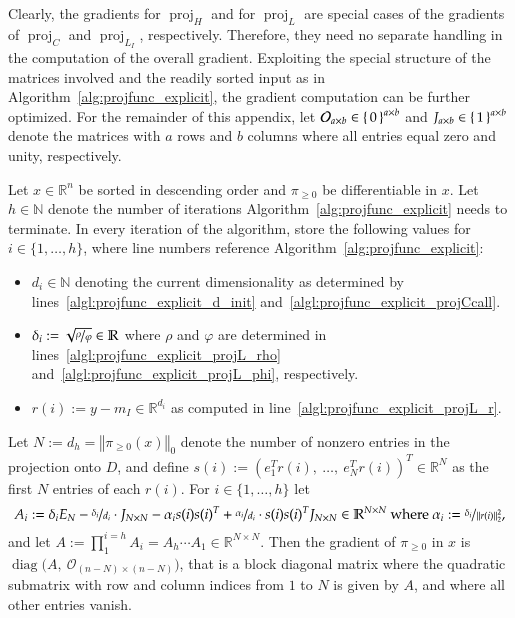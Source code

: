 \documentclass[twoside,11pt]{article}
\DeclareMathOperator{\proj}{proj}
\DeclareMathOperator{\diag}{diag}
\newcommand{\tvect}[3]{\left(#1,\ #2,\ #3\right)\transp}
\newcommand{\tdvect}[2]{\tvect{#1}{\dots}{#2}}
\newcommand{\N}{\mathbb{N}}
\newcommand{\R}{\mathbb{R}}
\newcommand{\0}{\mathcal{O}}
\newcommand{\transp}{^T}
\newcommand{\norm}[1]{\left\Vert#1\right\Vert}
\newcommand{\discint}[2]{\{#1,\dotsc,#2\}}
\newcommand{\inint}[2]{\in\discint{#1}{#2}}
\begin{document}
Clearly, the gradients for $\proj_H$ and for $\proj_{L}$ are special cases of the gradients of $\proj_C$ and $\proj_{L_I}$, respectively.
Therefore, they need no separate handling in the computation of the overall gradient.
Exploiting the special structure of the matrices involved and the readily sorted input as in Algorithm~\ref{alg:projfunc_explicit}, the gradient computation can be further optimized.
For the remainder of this appendix, let $\0_{a\times b}\in\set{0}^{a\times b}$ and $J_{a\times b}\in\set{1}^{a\times b}$ denote the matrices with $a$ rows and $b$ columns where all entries equal zero and unity, respectively.

\begin{theorem}
\label{thm:projfuncblockgrad}
Let $x\in\R^n$ be sorted in descending order and $\pi_{\geq 0}$ be differentiable in $x$.
Let $h\in\N$ denote the number of iterations Algorithm~\ref{alg:projfunc_explicit} needs to terminate.
In every iteration of the algorithm, store the following values for $i\inint{1}{h}$, where line numbers reference Algorithm~\ref{alg:projfunc_explicit}:
\begin{itemize}
  \item $d_i\in\N$ denoting the current dimensionality as determined by lines~\ref{algl:projfunc_explicit_d_init} and~\ref{algl:projfunc_explicit_projCcall}.
  \item $\delta_i := \sqrt{\nicefrac{\rho}{\varphi}}\in\R$ where $\rho$ and $\varphi$ are determined in lines~\ref{algl:projfunc_explicit_projL_rho} and~\ref{algl:projfunc_explicit_projL_phi}, respectively.
  \item $r(i) := y - m_I\in\R^{d_i}$ as computed in line~\ref{algl:projfunc_explicit_projL_r}.
\end{itemize}
Let $N := d_h = \norm{\pi_{\geq 0}(x)}_0$ denote the number of nonzero entries in the projection onto $D$, and define $s(i) := \tdvect{e_1\transp r(i)}{e_N\transp r(i)}\in\R^N$ as the first $N$ entries of each $r(i)$.
For $i\inint{1}{h}$ let
\begin{displaymath}
  A_i :=
  \delta_iE_N - \nicefrac{\delta_i}{d_i}\cdot J_{N\times N} -\alpha_is(i)s(i)\transp + \nicefrac{\alpha_i}{d_i}\cdot s(i)s(i)\transp J_{N\times N}\in\R^{N\times N}
  \text{ where }\alpha_i := \nicefrac{\delta_i}{\norm{r(i)}_2^2}\text{,}
\end{displaymath}
and let $A := \prod^{i=h}_1 A_i = A_h\cdots A_1\in\R^{N\times N}$.
Then the gradient of $\pi_{\geq 0}$ in $x$ is $\diag\big(A,\ \0_{(n-N)\times(n-N)}\big)$, that is a block diagonal matrix where the quadratic submatrix with row and column indices from $1$ to $N$ is given by $A$, and where all other entries vanish.
\end{theorem}
\end{document}
